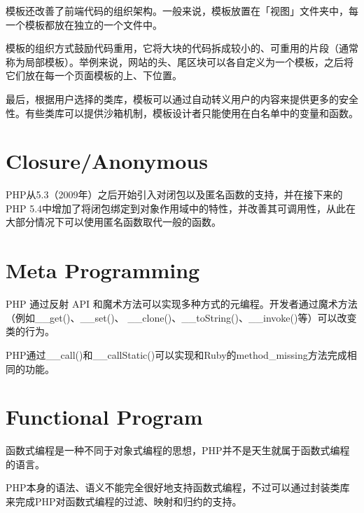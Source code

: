模板还改善了前端代码的组织架构。一般来说，模板放置在「视图」文件夹中，每一个模板都放在独立的一个文件中。

模板的组织方式鼓励代码重用，它将大块的代码拆成较小的、可重用的片段（通常称为局部模板）。举例来说，网站的头、尾区块可以各自定义为一个模板，之后将它们放在每一个页面模板的上、下位置。

最后，根据用户选择的类库，模板可以通过自动转义用户的内容来提供更多的安全性。有些类库可以提供沙箱机制，模板设计者只能使用在白名单中的变量和函数。





\section{Closure/Anonymous}

PHP从5.3（2009年）之后开始引入对闭包以及匿名函数的支持，并在接下来的PHP 5.4中增加了将闭包绑定到对象作用域中的特性，并改善其可调用性，从此在大部分情况下可以使用匿名函数取代一般的函数。

\section{Meta Programming}

PHP 通过反射 API 和魔术方法可以实现多种方式的元编程。开发者通过魔术方法（例如\_\_get()、\_\_set()、 \_\_clone()、\_\_toString()、\_\_invoke()等）可以改变类的行为。

PHP通过\_\_call()和\_\_callStatic()可以实现和Ruby的method\_missing方法完成相同的功能。

\section{Functional Program}


函数式编程是一种不同于对象式编程的思想，PHP并不是天生就属于函数式编程的语言。

PHP本身的语法、语义不能完全很好地支持函数式编程，不过可以通过封装类库来完成PHP对函数式编程的过滤、映射和归约的支持。



